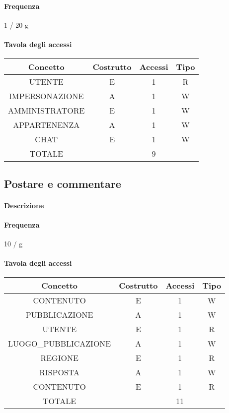 \documentclass[a4paper,12pt]{report}
\begin{document}
\paragraph{Frequenza} 1 / 20 g
\begin{table}[H]
\paragraph{Tavola degli accessi\newline}
\begin{tabular}{|c|c|c|c|}
\hline
Concetto       & Costrutto & Accessi & Tipo \\ \hline
UTENTE         & E         & 1       & R    \\ \hline
IMPERSONAZIONE & A         & 1       & W    \\ \hline
AMMINISTRATORE & E         & 1       & W    \\ \hline
APPARTENENZA   & A         & 1       & W    \\ \hline
CHAT           & E         & 1       & W    \\ \hline
TOTALE         &           & 9       &      \\ \hline
\end{tabular}
\end{table}
\subsection{Postare e commentare} \label{postare}
\paragraph{Descrizione}
\paragraph{Frequenza} 10 / g
\begin{table}[t]
\paragraph{Tavola degli accessi\newline}
\begin{tabular}{|c|c|c|c|}
\hline
Concetto             & Costrutto & Accessi & Tipo \\ \hline
CONTENUTO            & E         & 1       & W    \\ \hline
PUBBLICAZIONE        & A         & 1       & W    \\ \hline
UTENTE               & E         & 1       & R    \\ \hline
LUOGO\_PUBBLICAZIONE & A         & 1       & W    \\ \hline
REGIONE              & E         & 1       & R    \\ \hline
RISPOSTA             & A         & 1       & W    \\ \hline
CONTENUTO            & E         & 1       & R    \\ \hline
TOTALE               &           & 11      &      \\ \hline
\end{tabular}
\end{table}
\end{document}
